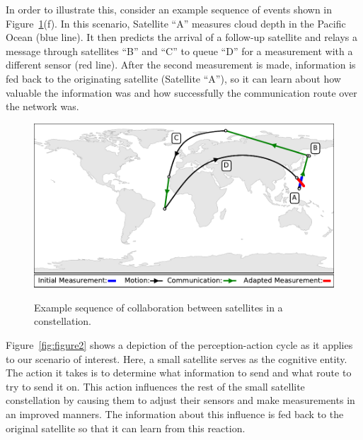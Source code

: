\documentclass[conference]{IEEEtran}
\begin{document}
In order to illustrate this, consider an example sequence of events shown in Figure~\ref{fig:figureColab}(f).  In this scenario, Satellite ``A'' measures cloud depth in the Pacific Ocean (blue line).  It then predicts the arrival of a follow-up satellite and relays a message through satellites ``B'' and ``C'' to queue ``D'' for a measurement with a different sensor (red line).  After the second measurement is made, information is fed back to the originating satellite (Satellite ``A''), so it can learn about how valuable the information was and how successfully the communication route over the network was.  

\begin{figure}[b!]
  \begin{center}
    \includegraphics[width=0.9\linewidth] {images/collaborate.pdf} \\
  \end{center}
  \caption{Example sequence of collaboration between satellites in a constellation.}
  \label{fig:figureColab}
\end{figure}

Figure~\ref{fig:figure2} shows a depiction of the perception-action cycle as it applies to our scenario of interest.  Here, a small satellite serves as the cognitive entity.  The action it takes is to determine what information to send and what route to try to send it on.  This action influences the rest of the small satellite constellation by causing them to adjust their sensors and make measurements in an improved manners.  The information about this influence is fed back to the original satellite so that it can learn from this reaction.   

\end{document}
